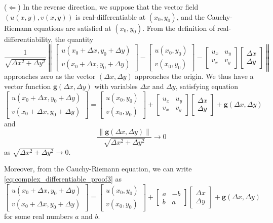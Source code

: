 ($\Leftarrow$)
In the reverse direction, we suppose that the vector field $(u(x,y), v(x,y))$ is real-differentiable at $(x_0,y_0)$, and the Cauchy-Riemann equations are satisfied at $(x_0,y_0)$. From the definition of real-differentiability, the quantity
$$
\frac{1}{\sqrt{\Delta x^2 + \Delta y^2}} 
\left\| \begin{bmatrix}
	u(x_0+\Delta x , y_0 + \Delta y) \\
	v(x_0+\Delta x , y_0 + \Delta y) 	
\end{bmatrix} -
\begin{bmatrix}
	u(x_0,y_0) \\ v(x_0,y_0)
\end{bmatrix} -
\begin{bmatrix}
	u_x & u_y \\ v_x & v_y 
\end{bmatrix} \begin{bmatrix}\Delta x \\ \Delta y\end{bmatrix}
\right\|
$$
approaches zero as the vector $(\Delta x, \Delta y)$ approaches the origin. We thus have a vector function $\mathbf{g}(\Delta x, \Delta y)$ with variables $\Delta x$ and $\Delta y$, satisfying equation
\begin{equation}
	\begin{bmatrix}
		u(x_0+\Delta x , y_0 + \Delta y) \\
		v(x_0+\Delta x , y_0 + \Delta y) 	
	\end{bmatrix} =
	\begin{bmatrix}
		u(x_0,y_0) \\ v(x_0,y_0)
	\end{bmatrix} +
	\begin{bmatrix}
		u_x & u_y \\ v_x & v_y 
	\end{bmatrix} \begin{bmatrix}\Delta x \\ \Delta y\end{bmatrix} + \mathbf{g}(\Delta x, \Delta y)
\label{eq:complex_differentiable_proof3}
\end{equation}
and
$$
\frac{\| \mathbf{g}(\Delta x, \Delta y) \|}{\sqrt{\Delta x^2 + \Delta y^2}} \rightarrow 0
$$
as $\sqrt{\Delta x ^2 + \Delta y^2}\rightarrow 0$.

Moreover, from the Cauchy-Riemann equation, we can write 
\eqref{eq:complex_differentiable_proof3} as
$$
	\begin{bmatrix}
	u(x_0+\Delta x , y_0 + \Delta y) \\
	v(x_0+\Delta x , y_0 + \Delta y) 	
\end{bmatrix} =
\begin{bmatrix}
	u(x_0,y_0) \\ v(x_0,y_0)
\end{bmatrix} +
\begin{bmatrix}
	a & -b \\ b & a 
\end{bmatrix} \begin{bmatrix}\Delta x \\ \Delta y\end{bmatrix} + \mathbf{g}(\Delta x, \Delta y)
$$
for some real numbers $a$ and $b$.

